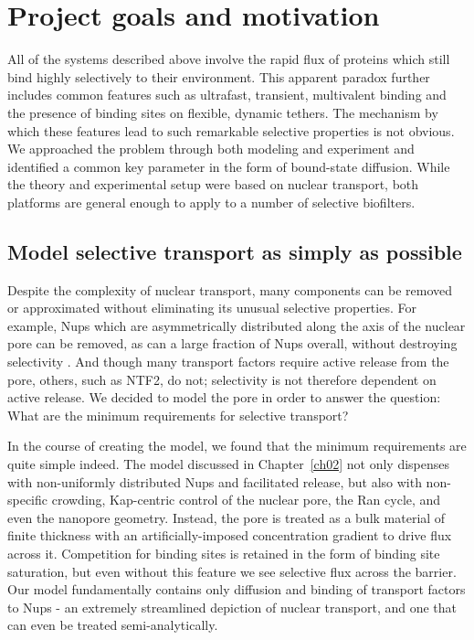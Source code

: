 \section{Project goals and motivation}

All of the systems described above involve the rapid flux of proteins which still bind highly selectively to their environment.  This apparent paradox further includes common features such as ultrafast, transient, multivalent binding and the presence of binding sites on flexible, dynamic tethers.  The mechanism by which these features lead to such remarkable selective properties is not obvious.  We approached the problem through both modeling and experiment and identified a common key parameter in the form of bound-state diffusion.  While the theory and experimental setup were based on nuclear transport, both platforms are general enough to apply to a number of selective biofilters.

\subsection{Model selective transport as simply as possible}

Despite the complexity of nuclear transport, many components can be removed or approximated without eliminating its unusual selective properties.   For example, Nups which are asymmetrically distributed along the axis of the nuclear pore can be removed, as can a large fraction of Nups overall, without destroying selectivity \cite{strawn04, zeitler04,kowalczyk11, jovanovic-talisman09}.  And though many transport factors require active release from the pore, others, such as NTF2, do not; selectivity is not therefore dependent on active release.  We decided to model the pore in order to answer the question: What are the minimum requirements for selective transport?

In the course of creating the model, we found that the minimum requirements are quite simple indeed.  The model discussed in Chapter~\ref{ch02} not only dispenses with non-uniformly distributed Nups and facilitated release, but also with non-specific crowding, Kap-centric control of the nuclear pore, the Ran cycle, and even the nanopore geometry.  Instead, the pore is treated as a bulk material of finite thickness with an artificially-imposed concentration gradient to drive flux across it.  Competition for binding sites is retained in the form of binding site saturation, but even without this feature we see selective flux across the barrier.  Our model fundamentally contains only diffusion and binding of transport factors to Nups - an extremely streamlined depiction of nuclear transport, and one that can even be treated semi-analytically.


